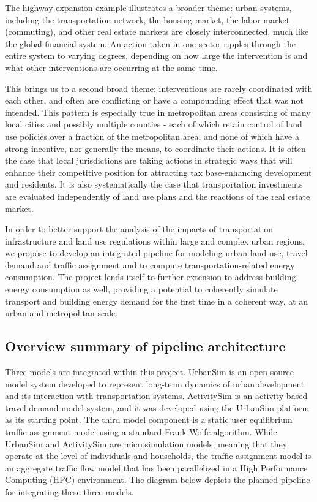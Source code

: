 The highway expansion example illustrates a broader theme: urban systems, including the transportation network, the housing market, the labor market (commuting), and other real estate markets are closely interconnected, much like the global financial system. An action taken in one sector ripples through the entire system to varying degrees, depending on how large the intervention is and what other interventions are occurring at the same time.

This brings us to a second broad theme: interventions are rarely coordinated with each other, and often are conflicting or have a compounding effect that was not intended. This pattern is especially true in metropolitan areas consisting of many local cities and possibly multiple counties - each of which retain control of land use policies over a fraction of the metropolitan area, and none of which have a strong incentive, nor generally the means, to coordinate their actions. It is often the case that local jurisdictions are taking actions in strategic ways that will enhance their competitive position for attracting tax base-enhancing development and residents. It is also systematically the case that transportation investments are evaluated independently of land use plans and the reactions of the real estate market.

In order to better support the analysis of the impacts of transportation infrastructure and land use regulations within large and complex urban regions, we propose to develop an integrated pipeline for modeling urban land use, travel demand and traffic assignment and to compute transportation-related energy consumption.  The project lends itself to further extension to address building energy consumption as well, providing a potential to coherently simulate transport and building energy demand for the first time in a coherent way, at an urban and metropolitan scale.  




\subsection{Overview summary of pipeline architecture}

Three models are integrated within this project.  UrbanSim is an open source model system developed to represent long-term dynamics of urban development and its interaction with transportation systems.  ActivitySim is an activity-based travel demand model system, and it was developed using the UrbanSim platform as its starting point.  The third model component is a static user equilibrium traffic assignment model using a standard Frank-Wolfe algorithm.  While UrbanSim and ActivitySim are microsimulation models, meaning that they operate at the level of individuals and households, the traffic assignment model is an aggregate traffic flow model that has been parallelized in a High Performance Computing (HPC) environment. The diagram below depicts the planned pipeline for integrating these three models.



